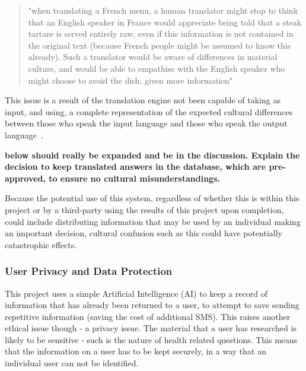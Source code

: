 \documentclass{article}
\begin{document}
\blockquote{"when translating a French menu, a human translator might stop to think that an English speaker in France would appreciate being told that a steak tartare is served entirely raw, even if this information is not contained in the original text (because French people might be assumed to know this already). Such a translator would be aware of differences in material culture, and would be able to empathise with the English speaker who might choose to avoid the dish, given more information"~\cite{melby2006can, kenny2011ethics}}

This issue is a result of the translation engine not been capable of taking as input, and using, a complete representation of the expected cultural differences between those who speak the input language and those who speak the output language~\cite{melby2006can}.

{\bf below should really be expanded and be in the discussion.  Explain the decision to keep translated answers in the database, which are pre-approved, to ensure no cultural misunderstandings.}

Because the potential use of this system, regardless of whether this is within this project or by a third-party using the results of this project upon completion, could include distributing information that may be used by an individual making an important decision, cultural confusion such as this could have potentially catastrophic effects.

\subsubsection{User Privacy and Data Protection}
This project uses a simple Artificial Intelligence (AI) to keep a record of information that has already been returned to a user, to attempt to save sending repetitive information (saving the cost of additional SMS).  This raises another ethical issue though - a privacy issue.  The material that a user has researched is likely to be sensitive - such is the nature of health related questions.  This means that the information on a user has to be kept securely, in a way that an individual user can not be identified.
\end{document}
